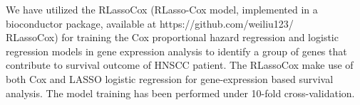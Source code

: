 \documentclass[preprint,12pt]{elsarticle}
\newenvironment{MyColorPar}[1]{%
    \leavevmode\color{#1}\ignorespaces%
}{%
}%
\begin{document}
\begin{MyColorPar}{blue}
We have utilized the RLassoCox\cite{Simon2011}\cite{Liu2021} (RLasso-Cox model, implemented in a bioconductor package, available at https://github.com/weiliu123/\\RLassoCox) for training the Cox proportional hazard regression and logistic regression models in gene expression analysis to identify a group of genes that contribute to survival outcome of HNSCC patient. 
The RLassoCox make use of both Cox and LASSO logistic regression for gene-expression based survival analysis.
The model training has been performed under 10-fold cross-validation.



 




\end{MyColorPar}
\end{document}
